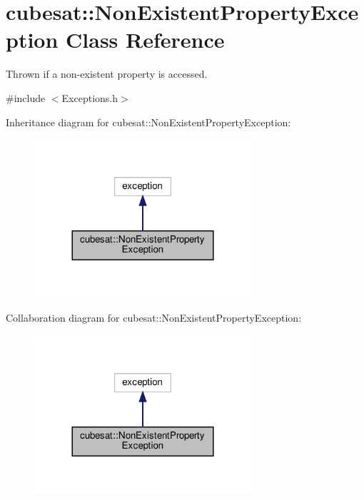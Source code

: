 \hypertarget{classcubesat_1_1NonExistentPropertyException}{}\section{cubesat\+:\+:Non\+Existent\+Property\+Exception Class Reference}
\label{classcubesat_1_1NonExistentPropertyException}


Thrown if a non-\/existent property is accessed.  




{\ttfamily \#include $<$Exceptions.\+h$>$}



Inheritance diagram for cubesat\+:\+:Non\+Existent\+Property\+Exception\+:\nopagebreak
\begin{figure}[H]
\begin{center}
\leavevmode
\includegraphics[width=228pt]{classcubesat_1_1NonExistentPropertyException__inherit__graph}
\end{center}
\end{figure}


Collaboration diagram for cubesat\+:\+:Non\+Existent\+Property\+Exception\+:\nopagebreak
\begin{figure}[H]
\begin{center}
\leavevmode
\includegraphics[width=228pt]{classcubesat_1_1NonExistentPropertyException__coll__graph}
\end{center}
\end{figure}
